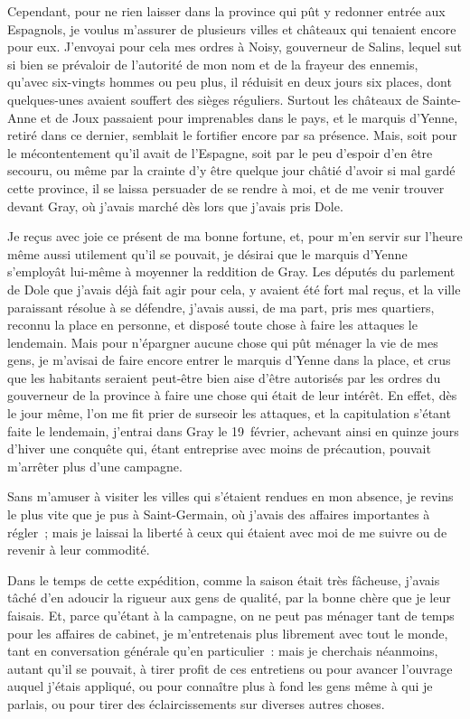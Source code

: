 \documentclass[french,twoside]{book} %
\begin{document}
Cependant, pour ne rien laisser dans la province qui pût y redonner entrée aux Espagnols, je voulus m’assurer de plusieurs villes et châteaux qui tenaient encore pour eux. J’envoyai pour cela mes ordres à Noisy, gouverneur de Salins, lequel sut si bien se prévaloir de l’autorité de mon nom et de la frayeur des ennemis, qu’avec six-vingts hommes ou peu plus, il réduisit en deux jours six places, dont quelques-unes avaient souffert des sièges réguliers. Surtout les châteaux de Sainte-Anne et de Joux passaient pour imprenables dans le pays, et le marquis d’Yenne, retiré dans ce dernier, semblait le fortifier encore par sa présence. Mais, soit pour le mécontentement qu’il avait de l’Espagne, soit par le peu d’espoir d’en être secouru, ou même par la crainte d’y être quelque jour châtié d’avoir si mal gardé cette province, il se laissa persuader de se rendre à moi, et de me venir trouver devant Gray, où j’avais marché dès lors que j’avais pris Dole.\par
Je reçus avec joie ce présent de ma bonne fortune, et, pour m’en servir sur l’heure même aussi utilement qu’il se pouvait, je désirai que le marquis d’Yenne s’employât lui-même à moyenner la reddition de Gray. Les députés du parlement de Dole que j’avais déjà fait agir pour cela, y avaient été fort mal reçus, et la ville paraissant résolue à se défendre, j’avais aussi, de ma part, pris mes quartiers, reconnu la place en personne, et disposé toute chose à faire les attaques le lendemain. Mais pour n’épargner aucune chose qui pût ménager la vie de mes gens, je m’avisai de faire encore entrer le marquis d’Yenne dans la place, et crus que les habitants seraient peut-être bien aise d’être autorisés par les ordres du gouverneur de la province à faire une chose qui était de leur intérêt. En effet, dès le jour même, l’on me fit prier de surseoir les attaques, et la capitulation s’étant faite le lendemain, j’entrai dans Gray le 19 février, achevant ainsi en quinze jours d’hiver une conquête qui, étant entreprise avec moins de précaution, pouvait m’arrêter plus d’une campagne.\par
Sans m’amuser à visiter les villes qui s’étaient rendues en mon absence, je revins le plus vite que je pus à Saint-Germain, où j’avais des affaires importantes à régler ; mais je laissai la liberté à ceux qui étaient avec moi de me suivre ou de revenir à leur commodité.\par
Dans le temps de cette expédition, comme la saison était très fâcheuse, j’avais tâché d’en adoucir la rigueur aux gens de qualité, par la bonne chère que je leur faisais. Et, parce qu’étant à la campagne, on ne peut pas ménager tant de temps pour les affaires de cabinet, je m’entretenais plus librement avec tout le monde, tant en conversation générale qu’en particulier : mais je cherchais néanmoins, autant qu’il se pouvait, à tirer profit de ces entretiens ou pour avancer l’ouvrage auquel j’étais appliqué, ou pour connaître plus à fond les gens même à qui je parlais, ou pour tirer des éclaircissements sur diverses autres choses.\par
\end{document}
